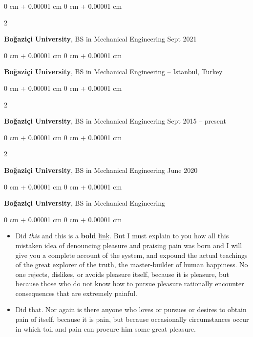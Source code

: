 \documentclass[10pt, letterpaper]{article}
\newenvironment{highlights}{
    \begin{itemize}[
        topsep=0.10 cm,
        parsep=0.10 cm,
        partopsep=0pt,
        itemsep=0pt,
        leftmargin=0 cm + 10pt
    ]
}{
    \end{itemize}
} %
\newenvironment{onecolentry}{
    \begin{adjustwidth}{
        0 cm + 0.00001 cm
    }{
        0 cm + 0.00001 cm
    }
}{
    \end{adjustwidth}
} %
\newenvironment{twocolentry}[2][]{
    \onecolentry
    \def\secondColumn{#2}
    \setcolumnwidth{\fill, 4.5 cm}
    \begin{paracol}{2}
}{
    \switchcolumn \raggedleft \secondColumn
    \end{paracol}
    \endonecolentry
} %
\begin{document}
        \vspace{0.2 cm}

        \begin{twocolentry}{
            Sept 2021
        }
            \textbf{Boğaziçi University}, BS in Mechanical Engineering\end{twocolentry}



        \vspace{0.2 cm}

        \begin{onecolentry}
            \textbf{Boğaziçi University}, BS in Mechanical Engineering -- Istanbul, Turkey\end{onecolentry}



        \vspace{0.2 cm}

        \begin{twocolentry}{
            Sept 2015 – present
        }
            \textbf{Boğaziçi University}, BS in Mechanical Engineering\end{twocolentry}



        \vspace{0.2 cm}

        \begin{twocolentry}{
            June 2020
        }
            \textbf{Boğaziçi University}, BS in Mechanical Engineering\end{twocolentry}



        \vspace{0.2 cm}

        \begin{onecolentry}
            \textbf{Boğaziçi University}, BS in Mechanical Engineering\end{onecolentry}

        \vspace{0.10 cm}
        \begin{onecolentry}
            \begin{highlights}
                \item Did \textit{this} and this is a \textbf{bold} \href{https://example.com}{link}. But I must explain to you how all this mistaken idea of denouncing pleasure and praising pain was born and I will give you a complete account of the system, and expound the actual teachings of the great explorer of the truth, the master-builder of human happiness. No one rejects, dislikes, or avoids pleasure itself, because it is pleasure, but because those who do not know how to pursue pleasure rationally encounter consequences that are extremely painful.
                \item Did that. Nor again is there anyone who loves or pursues or desires to obtain pain of itself, because it is pain, but because occasionally circumstances occur in which toil and pain can procure him some great pleasure.
            \end{highlights}
        \end{onecolentry}
\end{document}
